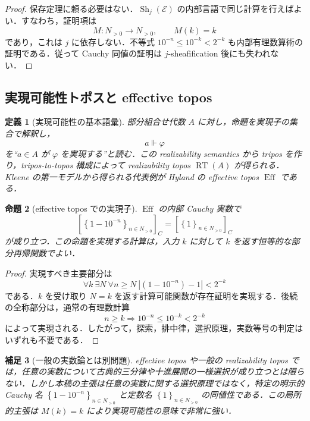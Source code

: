 \documentclass[a4paper,11pt]{ltjsarticle}
\theoremstyle{jpdef}
\newtheorem{definition}{定義}[section]
\newtheorem{remark}[definition]{補足}
\theoremstyle{jpthm}
\newtheorem{proposition}[definition]{命題}
\newcommand{\seq}[2]{\left\{#1\right\}_{#2}}
\newcommand{\Sh}{\operatorname{Sh}}
\newcommand{\Eff}{\operatorname{Eff}}
\begin{document}
\begin{proof}
保存定理に頼る必要はない．\(\Sh_j(\mathcal E)\) の内部言語で同じ計算を行えばよい．すなわち，証明項は
\[
  M:N_{>0}\to N_{>0},\qquad M(k)=k
\]
であり，これは \(j\) に依存しない．不等式 \(10^{-n}\le10^{-k}<2^{-k}\) も内部有理数算術の証明である．従って Cauchy 同値の証明は \(j\)-sheafification 後にも失われない．
\end{proof}

\subsection{実現可能性トポスと effective topos}

\begin{definition}[実現可能性の基本語彙]
部分組合せ代数 \(A\) に対し，命題を実現子の集合で解釈し，
\[
  a\Vdash\varphi
\]
を``\(a\in A\) が \(\varphi\) を実現する''と読む．この realizability semantics から tripos を作り，tripos-to-topos 構成によって realizability topos \(\operatorname{RT}(A)\) が得られる．Kleene の第一モデルから得られる代表例が Hyland の effective topos \(\Eff\) である．
\end{definition}

\begin{proposition}[effective topos での実現子]
\(\Eff\) の内部 Cauchy 実数で
\[
  [\seq{1-10^{-n}}{n\in N_{>0}}]_C=[\seq{1}{n\in N_{>0}}]_C
\]
が成り立つ．この命題を実現する計算は，入力 \(k\) に対して \(k\) を返す恒等的な部分再帰関数でよい．
\end{proposition}

\begin{proof}
実現すべき主要部分は
\[
  \forall k\ \exists N\ \forall n\ge N\ |(1-10^{-n})-1|<2^{-k}
\]
である．\(k\) を受け取り \(N=k\) を返す計算可能関数が存在証明を実現する．後続の全称部分は，通常の有理数計算
\[
  n\ge k\Rightarrow 10^{-n}\le10^{-k}<2^{-k}
\]
によって実現される．したがって，探索，排中律，選択原理，実数等号の判定はいずれも不要である．
\end{proof}

\begin{remark}[一般の実数論とは別問題]
effective topos や一般の realizability topos では，任意の実数について古典的三分律や十進展開の一様選択が成り立つとは限らない．しかし本稿の主張は任意の実数に関する選択原理ではなく，特定の明示的 Cauchy 名 \(\seq{1-10^{-n}}{n\in N_{>0}}\) と定数名 \(\seq{1}{n\in N_{>0}}\) の同値性である．この局所的主張は \(M(k)=k\) により実現可能性の意味で非常に強い．
\end{remark}
\end{document}
